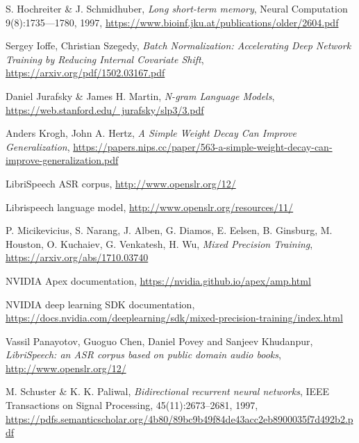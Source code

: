 \documentclass[licencjacka,en]{pracamgr}
\begin{document}
\begin{thebibliography}{99}
		 S. Hochreiter \& J. Schmidhuber, \textit{Long short-term memory}, Neural Computation 9(8):1735—1780, 1997,  \href{https://www.bioinf.jku.at/publications/older/2604.pdf}{https://www.bioinf.jku.at/publications/older/2604.pdf}

		 Sergey Ioffe, Christian Szegedy, \textit{Batch Normalization: Accelerating Deep Network Training by Reducing Internal Covariate Shift},  \href{https://arxiv.org/pdf/1502.03167.pdf}{https://arxiv.org/pdf/1502.03167.pdf}

         Daniel Jurafsky \& James H. Martin, \textit{N-gram Language Models}, 	\href{https://web.stanford.edu/~jurafsky/slp3/3.pdf}{https://web.stanford.edu/~jurafsky/slp3/3.pdf}

		 Anders Krogh, John A. Hertz, \textit{A Simple Weight Decay Can Improve Generalization}, \href{https://papers.nips.cc/paper/563-a-simple-weight-decay-can-improve-generalization.pdf}{https://papers.nips.cc/paper/563-a-simple-weight-decay-can-improve-generalization.pdf}

         LibriSpeech ASR corpus,  \href{http://www.openslr.org/12/}{http://www.openslr.org/12/}

         Librispeech language model,
		\href{http://www.openslr.org/resources/11/}{http://www.openslr.org/resources/11/}

          P. Micikevicius, S. Narang, J. Alben, G. Diamos, E. Eelsen, B. Ginsburg, M. Houston, O. Kuchaiev, G. Venkatesh, H. Wu, \textit{Mixed Precision Training},
		\href{https://arxiv.org/abs/1710.03740}{https://arxiv.org/abs/1710.03740}

		NVIDIA Apex documentation,
		\href{https://nvidia.github.io/apex/amp.html}{https://nvidia.github.io/apex/amp.html}

		NVIDIA deep learning SDK documentation, 
		\href{https://docs.nvidia.com/deeplearning/sdk/mixed-precision-training/index.html}{https://docs.nvidia.com/deeplearning/sdk/mixed-precision-training/index.html}

         Vassil Panayotov, Guoguo Chen, Daniel Povey and Sanjeev Khudanpur, \textit{LibriSpeech: an ASR corpus based on public domain audio books}, 
		\href{http://www.openslr.org/12/}{http://www.openslr.org/12/}

         M. Schuster \& K. K. Paliwal, \textit{Bidirectional recurrent neural networks}, IEEE Transactions on Signal Processing, 45(11):2673–2681, 1997,  \href{https://pdfs.semanticscholar.org/4b80/89bc9b49f84de43acc2eb8900035f7d492b2.pdf}{https://pdfs.semanticscholar.org/4b80/89bc9b49f84de43acc2eb8900035f7d492b2.pdf}


\end{thebibliography}
\end{document}
